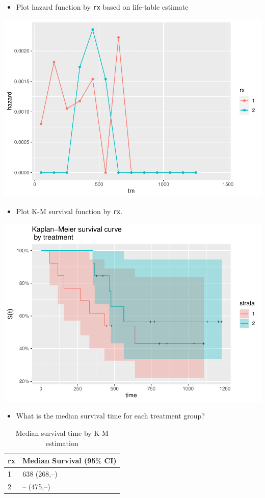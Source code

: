 \documentclass[
]{article}
\providecommand{\tightlist}{%
  \setlength{\itemsep}{0pt}\setlength{\parskip}{0pt}}
\begin{document}
\newpage

\begin{itemize}
\tightlist
\item
  Plot hazard function by \texttt{rx} based on life-table estimate
\end{itemize}

\includegraphics[width=0.8\linewidth]{P8108-hw3-rw2844_files/figure-latex/life_table_hazard-1}

\begin{itemize}
\tightlist
\item
  Plot K-M survival function by \texttt{rx}.
\end{itemize}

\includegraphics[width=0.8\linewidth]{P8108-hw3-rw2844_files/figure-latex/km_surv_rx-1}
\newpage

\begin{itemize}
\tightlist
\item
  What is the median survival time for each treatment group?
\end{itemize}

\begin{table}[H]

\caption{\label{tab:median_surv}Median survival time by K-M estimation}
\centering
\begin{tabular}[t]{ll}
\toprule
rx & Median Survival (95$\%$ CI)\\
\midrule
1 & 638 (268,--)\\
2 & -- (475,--)\\
\bottomrule
\end{tabular}
\end{table}
\end{document}
